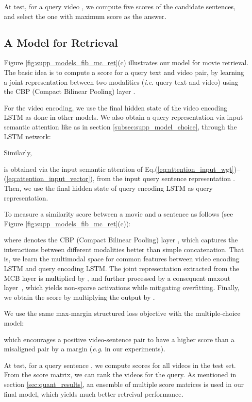 \documentclass[10pt,twocolumn,letterpaper]{article}
\makeatletter
\theoremstyle{nonumberplain}
\DeclareRobustCommand\onedot{\futurelet\@let@token\@onedot}
\def\onedot{.\@\xspace}
\def\eg{\emph{e.g}\onedot} \def\Eg{\emph{E.g}\onedot}
\def\ie{\emph{i.e}\onedot} \def\Ie{\emph{I.e}\onedot}
\makeatother
\begin{document}
At test, for a query video , we compute five scores  of the candidate sentences,
and select the one with maximum score  as the answer.

\smallskip
\subsection{A Model for Retrieval}
\label{subsec:supp_model_retrieval}


Figure \ref{fig:supp_models_fib_mc_ret}(c) illustrates our model for movie retrieval.
The basic idea is to compute a score for a query text and video pair,
by learning a joint representation between two modalities (\ie query text and video)
using the CBP (Compact Bilinear Pooling) layer \cite{akira-emnlp-2016}.


For the video encoding, we use the final hidden state  of the video encoding LSTM as done in other models.
We also obtain a query representation via input semantic attention like as in section \ref{subsec:supp_model_choice}, through the LSTM network:

Similarly,

is obtained via the input semantic attention of Eq.(\ref{eq:attention_input_wgt})--(\ref{eq:attention_input_vector}),
from the input query sentence representation .
Then, we use the final hidden state  of query encoding LSTM as query representation. 

To measure a similarity score  between a movie  and a sentence  as follows (see Figure \ref{fig:supp_models_fib_mc_ret}(c)):

where  denotes the CBP (Compact Bilinear Pooling) layer \cite{akira-emnlp-2016}, which captures the interactions between different modalities better than simple concatenation.
That is, we learn the multimodal space for common features between video encoding LSTM and query encoding LSTM.
The joint representation extracted from the MCB layer is multiplied by , and further processed by a consequent maxout layer~\cite{Goodfellow-icml-2013},
which yields non-sparse activations while mitigating overfitting.
Finally, we obtain the score  by multiplying the output by .


We use the same max-margin structured loss objective with the multiple-choice model:

which encourages a positive video-sentence pair to have a higher score than a misaligned pair by a margin  (\eg  in our experiments).

At test, for a query sentence , we compute scores  for all videos  in the test set.
From the score matrix, we can rank the videos for the query.
As mentioned in section \ref{sec:quant_results}, an ensemble of multiple score matrices
is used in our final model, which yields much better retreival performance.
\end{document}
